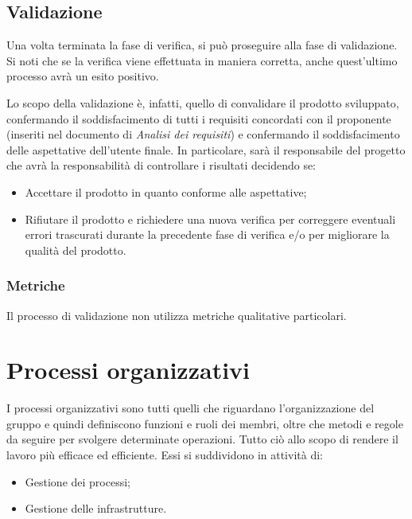 \subsection{Validazione}\label{sec:processi_di_supporto:validazione}
Una volta terminata la fase di verifica, si può proseguire alla fase di validazione. Si noti che se la verifica viene effettuata in maniera corretta, anche quest'ultimo processo avrà un esito positivo.

Lo scopo della validazione è, infatti, quello di convalidare il prodotto sviluppato, confermando il soddisfacimento di tutti i requisiti concordati con il proponente (inseriti nel documento di \textit{Analisi dei requisiti})
e confermando il soddisfacimento delle aspettative dell'utente finale.
In particolare, sarà il responsabile del progetto che avrà la responsabilità di controllare i risultati decidendo se:
\begin{itemize}
    \item Accettare il prodotto in quanto conforme alle aspettative;
    \item Rifiutare il prodotto e richiedere una nuova verifica per correggere eventuali errori trascurati durante la precedente fase di verifica e/o per migliorare la qualità del prodotto.
\end{itemize}

\subsubsection{Metriche}\label{sec:processi_di_supporto:validazione:metriche}
Il processo di validazione non utilizza metriche qualitative particolari.

\newpage
\section{Processi organizzativi}\label{sec:processi_organizzativi}
I processi organizzativi sono tutti quelli che riguardano l’organizzazione del gruppo e quindi definiscono funzioni e ruoli dei membri, oltre che metodi e regole da seguire per svolgere determinate operazioni.
Tutto ciò allo scopo di rendere il lavoro più efficace ed efficiente.
Essi si suddividono in attività di:
\begin{itemize}
    \item Gestione dei processi;
    \item Gestione delle infrastrutture.
\end{itemize}


